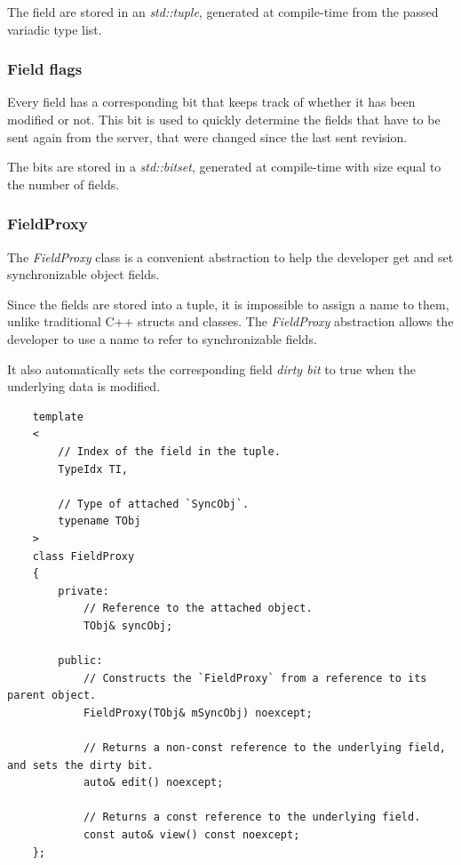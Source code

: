 \documentclass{report}
\def \cppStart {\begin{verbatim}}
\begin{document}
                    The field are stored in an \emph{std::tuple}, generated at compile-time from the passed variadic type list.

                \subsubsection{Field flags}

                    Every field has a corresponding bit that keeps track of whether it has been modified or not. 
                    This bit is used to quickly determine the fields that have to be sent again from the server, that were changed since the last sent revision.

                    The bits are stored in a \emph{std::bitset}, generated at compile-time with size equal to the number of fields.

                \subsubsection{FieldProxy}

                    The \emph{FieldProxy} class is a convenient abstraction to help the developer get and set synchronizable object fields.

                    Since the fields are stored into a tuple, it is impossible to assign a name to them, unlike traditional C++ structs and classes.
                    The \emph{FieldProxy} abstraction allows the developer to use a name to refer to synchronizable fields.

                    It also automatically sets the corresponding field \emph{dirty bit} to true when the underlying data is modified.

\cppStart
    template
    <
        // Index of the field in the tuple.
        TypeIdx TI, 

        // Type of attached `SyncObj`.
        typename TObj
    > 
    class FieldProxy
    {
        private:
            // Reference to the attached object.
            TObj& syncObj;

        public:
            // Constructs the `FieldProxy` from a reference to its parent object.
            FieldProxy(TObj& mSyncObj) noexcept;

            // Returns a non-const reference to the underlying field, and sets the dirty bit.
            auto& edit() noexcept;

            // Returns a const reference to the underlying field.
            const auto& view() const noexcept;
    };
\end{verbatim}
\end{document}
